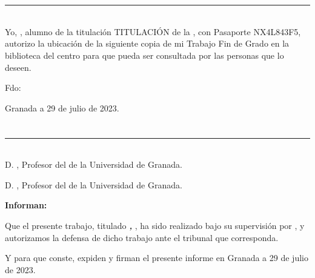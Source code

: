 \chapter*{}
\thispagestyle{empty}

\noindent\rule[-1ex]{\textwidth}{2pt}\\[4.5ex]

Yo, \textbf{\myName}, alumno de la titulación TITULACIÓN de la \textbf{\myFaculty}, 
con Pasaporte NX4L843F5, autorizo la ubicación de la siguiente copia de mi 
Trabajo Fin de Grado en la biblioteca del centro para que pueda ser
consultada por las personas que lo deseen.

\vspace{6cm}

\noindent Fdo: \myName

\vspace{2cm}

\begin{flushright}
Granada a 29 de julio de 2023.
\end{flushright}


\chapter*{}
\thispagestyle{empty}

\noindent\rule[-1ex]{\textwidth}{2pt}\\[4.5ex]

D. \textbf{\myProf}, Profesor del \myDepartment de la Universidad de Granada.

\vspace{0.5cm}

D. \textbf{\myOtherProf}, Profesor del \myDepartment de la Universidad de Granada.


\vspace{0.5cm}

\textbf{Informan:}

\vspace{0.5cm}

Que el presente trabajo, titulado \textit{\textbf{\myTitle, \mySubTitle}},
ha sido realizado bajo su supervisión por \textbf{\myName}, y autorizamos la defensa de dicho trabajo ante el tribunal
que corresponda.

\vspace{0.5cm}

Y para que conste, expiden y firman el presente informe en Granada a 29 de julio de 2023.

\vspace{1cm}

